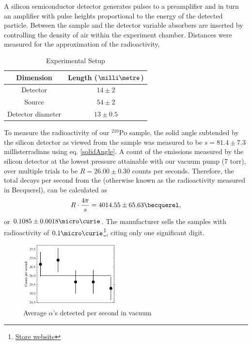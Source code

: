 \documentclass[12pt]{article}
\newcommand{\po}{{}^{210}\text{Po}}
\begin{document}
\begin{multicols}{2}
    A silicon semiconductor detector generates pulses to a preamplifier and in turn an amplifier with pulse heights proportional to the energy of the detected particle. Between the sample and the detector variable absorbers are inserted by controlling the density of air within the experiment chamber. Distances were measured for the approximation of the radioactivity,
    \begin{table}[H]
        \begin{center}
            \begin{tabular}{| c | c | }
                \hline
                Dimension & Length ($\milli\metre$) \\
                \hline
                Detector & $14 \pm 2$ \\
                Source & $54 \pm 2$ \\
                Detector diameter & $13 \pm 0.5$ \\
                \hline
            \end{tabular}
        \end{center}
        \caption{Experimental Setup}
        \label{table:1}
    \end{table}

    To measure the radioactivity of our $\po$ sample, the solid angle subtended by the silicon detector as viewed from the sample was measured to be $s = 81.4\pm7.3$ millisterradians using eq. \ref{solidAngle}. A count of the emissions measured by the silicon detector at the lowest pressure attainable with our vacuum pump (7 torr), over multiple trials to be $R = 26.00 \pm 0.30$ counts per seconds. Therefore, the total decays per second from the (otherwise known as the radioactivity measured in Becquerel), can be calculated as
    \begin{equation}
        R\cdot\frac{4\pi}{s} = 4014.55 \pm 65.63 \becquerel,
    \end{equation}
    or $0.1085 \pm 0.0018 \micro\curie$. The manufacturer sells the samples with radioactivity of $0.1\micro\curie$\footnote{\href{https://www.pasco.com/products/lab-apparatus/atomic-and-nuclear/sn-9085}{Store website}}, citing only one significant digit.
    \begin{figure}[H]
        \includegraphics[width=0.45\textwidth]{charts/sample_bq.png}
        \caption{Average $\alpha$'s detected per second in vacuum}
    \end{figure}


\end{multicols}
\end{document}
